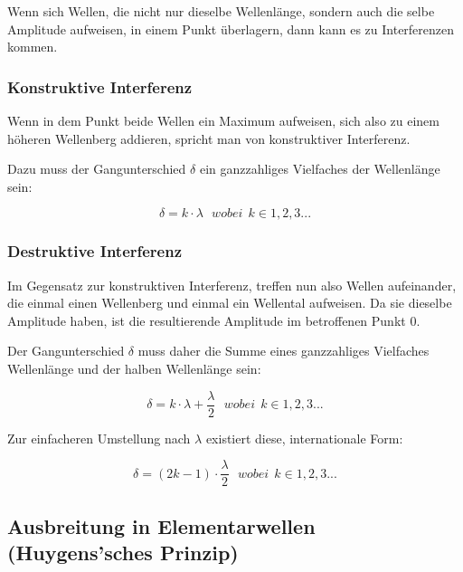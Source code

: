 Wenn sich Wellen, die nicht nur dieselbe Wellenlänge, sondern auch die selbe Amplitude aufweisen, in einem Punkt überlagern, dann kann es zu Interferenzen kommen.

	\subsubsection{Konstruktive Interferenz}
	
	Wenn in dem Punkt beide Wellen ein Maximum aufweisen, sich also zu einem höheren Wellenberg addieren, spricht man von konstruktiver Interferenz.
	
	Dazu muss der Gangunterschied $\delta$ ein ganzzahliges Vielfaches der Wellenlänge sein:
	
	\begin{equation}	\label{eq:kon_interferenz}
		\delta = k \cdot \lambda \ \ \ wobei \ \ k \in 1,2,3...
	\end{equation}
	
	\subsubsection{Destruktive Interferenz}
	
	Im Gegensatz zur konstruktiven Interferenz, treffen nun also Wellen aufeinander, die einmal einen Wellenberg und einmal ein Wellental aufweisen. Da sie dieselbe Amplitude haben, ist die resultierende Amplitude im betroffenen Punkt $0$.
	
	Der Gangunterschied $\delta$ muss daher die Summe eines ganzzahliges Vielfaches Wellenlänge und der halben Wellenlänge sein:
	
	\begin{equation}
		\delta = k \cdot \lambda + \frac{\lambda}{2} \ \ \ wobei \ \ k \in 1,2,3...
	\end{equation}

	Zur einfacheren Umstellung nach $\lambda$ existiert diese, internationale Form:
	
	\begin{equation} \label{eq:des_interferenz}
		\delta = (2k -1) \cdot \frac{\lambda}{2} \ \ \ wobei \ \ k \in 1,2,3...
	\end{equation}



\subsection[Ausbreitung in Elementarwellen]{Ausbreitung in Elementarwellen (Huygens'sches Prinzip)} \label{subsec:ausbreitung}

